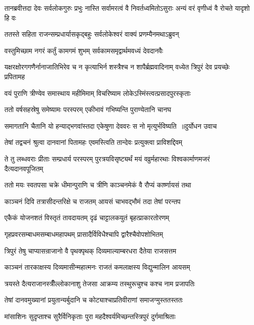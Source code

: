 \threelineshloka
{तानब्रवीत्तदा देवः सर्वलोकगुरुः प्रभुः}
{नास्ति सर्वामरत्वं वै निवर्तध्वमितोऽसुराः}
{अन्यं वरं वृणीध्वं वै रोचते यादृशो हि वः}


\twolineshloka
{ततस्ते सहिता राजन्सम्प्रधार्यासकृद्बहुः}
{सर्वलोकेश्वरं वाक्यं प्रणम्यैनमथाऽब्रुवन्}


\twolineshloka
{वस्तुमिच्छाम नगरं कर्तुं कामगमं शुभम्}
{सर्वकामसमृद्वार्थमवध्यं देवदानवैः}


\threelineshloka
{यक्षरक्षोरगगणैर्नानाजातिभिरेव च}
{न कृत्याभिर्न शस्त्रैश्च न शापैर्ब्रह्मवादिनाम्}
{वध्येत त्रिपुरं देव प्रयच्छेः प्रपितामह}


\twolineshloka
{वयं पुराणि त्रीण्येव समास्थाय महीमिमाम्}
{विचरिष्याम लोकेऽस्मिंस्त्वत्प्रसादपुरस्कृताः}


\twolineshloka
{ततो वर्षसहस्रेषु समेष्यामः परस्परम्}
{एकीभावं गभिष्यन्ति पुराण्येतानि चानघ}


\threelineshloka
{समागतानि चैतानि यो हन्याद्भगवांस्तदा}
{एकेषुणा देववरः स नो मृत्युर्भविष्यति ॥दुर्योधन उवाच}
{}


\twolineshloka
{तेषां तद्वचनं श्रुत्वा दानवानां पितामहः}
{एवमस्त्विति तान्देवः प्रत्युक्त्वा प्राविशद्दिवम्}


\threelineshloka
{ते तु लब्धवराः प्रीताः सम्प्रधार्य परस्परम्}
{पुरत्रयविसृष्ट्यर्थं मयं वव्रुर्महारथाः}
{विश्वकार्माणमजरं दैत्यदानवपूजितम्}


\twolineshloka
{ततो मयः स्वतपसा चक्रे धीमान्पुराणि च}
{त्रीणि काञ्चनमेकं वै रौप्यं कार्ष्णायसं तथा}


\twolineshloka
{काञ्चनं दिवि तत्रासीदन्तरिक्षे च राजतम्}
{आयसं चाभवद्भौमं तदा तेषां परन्तप}


\twolineshloka
{एकैकं योजनशतं विस्तृतं तावदायतम्}
{दृढं चाट्टालकयुतं बृहत्प्राकारतोरणम्}


\twolineshloka
{गृहप्रवरसम्बाधमसम्बाधमहापथम्}
{प्रासादैर्विविधैश्चापि द्वारैश्चैवोपशोभितम्}


\twolineshloka
{त्रिपुरं तेषु चाप्यासन्राजानो वै पृथक्पृथक्}
{दिव्यमाल्याम्बरधरा दैतेया राजसत्तम}


\twolineshloka
{काञ्चनं तारकाक्षस्य दिव्यमासीन्महात्मनः}
{राजतं कमलाक्षस्य विद्युन्मालिन आयसम्}


\twolineshloka
{त्रयस्ते दैत्यराजानस्त्रीँल्लोकानाशु तेजसा}
{आक्रम्य तस्थुरूचुश्च कश्च नाम प्रजापतिः}


\twolineshloka
{तेषां दानवमुख्यानां प्रयुतान्यर्बुदानि च}
{कोट्याश्चाप्रतिवीराणां समाजग्मुस्ततस्ततः}


\twolineshloka
{मांसाशिनः सुदृप्ताश्च सुरैर्विनिकृताः पुरा}
{महदैश्वर्यमिच्छन्तस्त्रिपुरं दुर्गमाश्रिताः}


